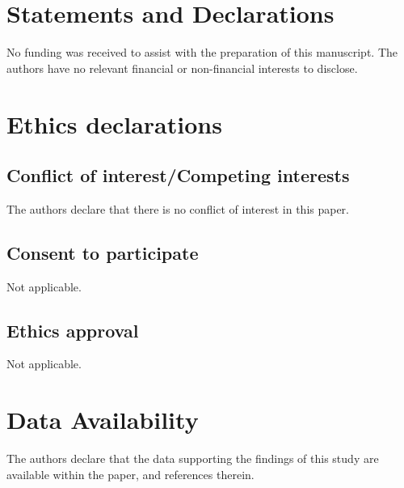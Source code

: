 \documentclass[english]{article}
\begin{document}
\section{Statements and Declarations}
No funding was received to assist with the preparation of this manuscript.  The authors have no relevant financial or non-financial interests to disclose.

\section{Ethics declarations}
\subsection{Conflict of interest/Competing interests} The authors declare that there is no conflict of interest in this paper.
\subsection{Consent to participate} Not applicable.
\subsection{Ethics approval} Not applicable.



\section{Data Availability}
The authors declare that the data supporting the findings of this study are available within the paper, and references therein.

\newpage
\end{document}
